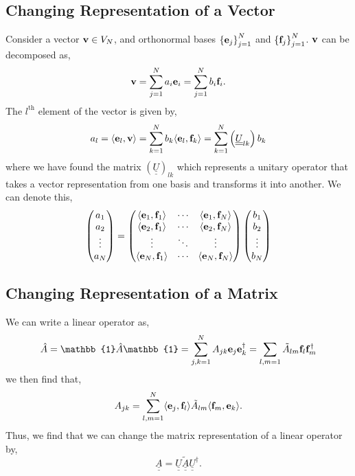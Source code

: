 \documentclass{book}
\def\innerproduct#1#2{\langle#1,#2\rangle}
\def\doubleunderline#1{\underline{\underline{#1}}}
\begin{document}
\subsection{Changing Representation of a Vector}
Consider a vector $\vb{v} \in V_N$, and orthonormal bases $\left\{\vb{e}_j\right\}_{j=1}^N$ and $\left\{\vb{f}_j\right\}_{j=1}^N$. $\vb{v}$ can be decomposed as,
\begin{equation}
		\vb{v} = \sum_{j=1}^Na_i\vb{e}_i = \sum_{j=1}^N b_i\vb{f}_i.
\end{equation}
The $l^{\text{th}}$ element of the vector is given by,
\begin{equation}
	a_l = \innerproduct{\vb{e}_l}{\vb{v}} = \sum_{k=1}^Nb_k\innerproduct{\vb{e}_l}{\vb{f}_k} = \sum_{k=1}^N\left(\doubleunderline{U}_{lk}\right)b_k
\end{equation}
where we have found the matrix $(\doubleunderline{U})_{lk}$ which represents a unitary operator that takes a vector representation from one basis and transforms it into another. We can denote this,
\begin{equation}
	\begin{pmatrix}
		a_1 \\ a_2 \\ \vdots \\ a_N
	\end{pmatrix} = \begin{pmatrix}
	\innerproduct{\vb{e}_1}{\vb{f}_1} & \cdots & \innerproduct{\vb{e}_1}{\vb{f}_N} \\
	\innerproduct{\vb{e}_2}{\vb{f}_1} & \cdots & \innerproduct{\vb{e}_2}{\vb{f}_N} \\
	\vdots & \ddots & \vdots \\
	\innerproduct{\vb{e}_N}{\vb{f}_1} & \cdots & \innerproduct{\vb{e}_N}{\vb{f}_N}
	\end{pmatrix}\begin{pmatrix}
	b_1 \\ b_2 \\ \vdots \\ b_N
	\end{pmatrix}
\end{equation} 
\subsection{Changing Representation of a Matrix}
We can write a linear operator as,
\begin{equation}
	\hat{A} = \mathbb{1}\hat{A} \mathbb{1} = \sum_{j,k=1}^NA_{jk}\vb{e}_j\vb{e}_k^{\dag} = \sum_{l,m=1} \tilde{A}_{lm}\vb{f}_l\vb{f}_m^{\dag}
\end{equation}
we then find that,
\begin{equation}
	A_{jk} = \sum_{l,m=1}^N \innerproduct{\vb{e}_j}{\vb{f}_l}\tilde{A}_{lm}\innerproduct{\vb{f}_m}{\vb{e}_k}.
\end{equation}
Thus, we find that we can change the matrix representation of a linear operator by,
\begin{equation}
	\doubleunderline{A} = \doubleunderline{U}\doubleunderline{\tilde{A}}\doubleunderline{U}^{\dag}.
\end{equation}
\end{document}

